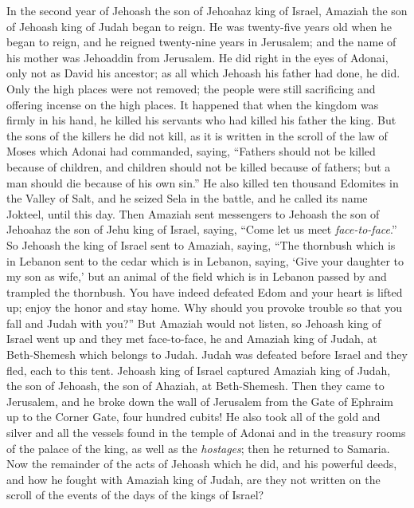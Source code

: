 \begin{biblechapter} %
 In the second year of Jehoash the son of Jehoahaz king of Israel, Amaziah the son of Jehoash king of Judah began to reign.
\verse He was twenty-five years old when he began to reign, and he reigned twenty-nine years in Jerusalem; and the name of his mother was Jehoaddin from Jerusalem.
\verse He did right in the eyes of Adonai, only not as David his ancestor; as all which Jehoash his father had done, he did.
\verse Only the high places were not removed; the people were still sacrificing and offering incense on the high places.
\verse It happened that when the kingdom was firmly in his hand, he killed his servants who had killed his father the king.
\verse But the sons of the killers he did not kill, as it is written in the scroll of the law of Moses which Adonai had commanded, saying, “Fathers should not be killed because of children, and children should not be killed because of fathers; but a man should die because of his own sin.”
\verse He also killed ten thousand Edomites in the Valley of Salt, and he seized Sela in the battle, and he called its name Jokteel, until this day.
\verse Then Amaziah sent messengers to Jehoash the son of Jehoahaz the son of Jehu king of Israel, saying, “Come let us meet \textit{face-to-face}.”
\verse So Jehoash the king of Israel sent to Amaziah, saying, “The thornbush which is in Lebanon sent to the cedar which is in Lebanon, saying, ‘Give your daughter to my son as wife,’ but an animal of the field which is in Lebanon passed by and trampled the thornbush.
\verse You have indeed defeated Edom and your heart is lifted up; enjoy the honor and stay home. Why should you provoke trouble so that you fall and Judah with you?”
\verse But Amaziah would not listen, so Jehoash king of Israel went up and they met face-to-face, he and Amaziah king of Judah, at Beth-Shemesh which belongs to Judah.
\verse Judah was defeated before Israel and they fled, each to this tent.
\verse Jehoash king of Israel captured Amaziah king of Judah, the son of Jehoash, the son of Ahaziah, at Beth-Shemesh. Then they came to Jerusalem, and he broke down the wall of Jerusalem from the Gate of Ephraim up to the Corner Gate, four hundred cubits!
\verse He also took all of the gold and silver and all the vessels found in the temple of Adonai and in the treasury rooms of the palace of the king, as well as the \textit{hostages}; then he returned to Samaria.
\verse Now the remainder of the acts of Jehoash which he did, and his powerful deeds, and how he fought with Amaziah king of Judah, are they not written on the scroll of the events of the days of the kings of Israel?

\end{biblechapter}
